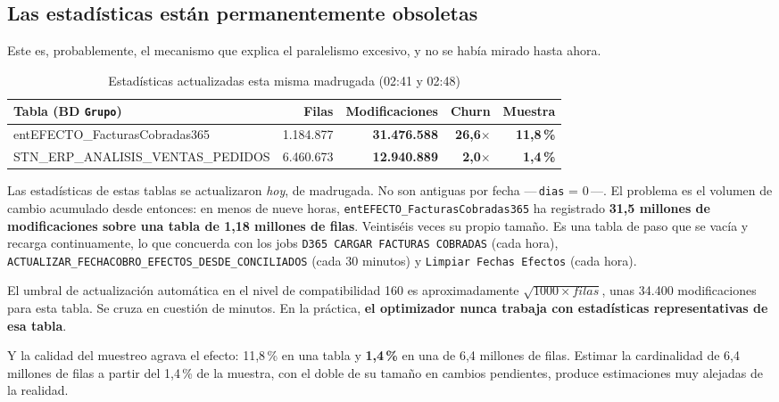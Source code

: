 \documentclass[11pt,a4paper]{article}
\newcommand{\cod}[1]{\texttt{\small #1}}
\newcommand{\critico}[1]{\textcolor{rojo}{\textbf{#1}}}
\begin{document}
\subsection{Las estadísticas están permanentemente obsoletas}

Este es, probablemente, el mecanismo que explica el paralelismo excesivo, y no
se había mirado hasta ahora.

\begin{table}[h]
\centering
\small
\begin{tabular}{lrrrr}
\toprule
\textbf{Tabla (BD \cod{Grupo})} & \textbf{Filas} & \textbf{Modificaciones} &
\textbf{Churn} & \textbf{Muestra} \\
\midrule
entEFECTO\_FacturasCobradas365 & 1.184.877 & \critico{31.476.588} &
  \critico{26,6$\times$} & \critico{11,8\,\%} \\
STN\_ERP\_ANALISIS\_VENTAS\_PEDIDOS & 6.460.673 & \critico{12.940.889} &
  \critico{2,0$\times$} & \critico{1,4\,\%} \\
\bottomrule
\end{tabular}
\caption{Estadísticas actualizadas esta misma madrugada (02:41 y 02:48)}
\end{table}

Las estadísticas de estas tablas se actualizaron \emph{hoy}, de madrugada. No
son antiguas por fecha —\,\cod{dias} = 0\,—. El problema es el volumen de
cambio acumulado desde entonces: en menos de nueve horas,
\cod{entEFECTO\_FacturasCobradas365} ha registrado \textbf{31,5 millones de
modificaciones sobre una tabla de 1,18 millones de filas}. Veintiséis veces su
propio tamaño. Es una tabla de paso que se vacía y recarga continuamente, lo
que concuerda con los jobs \cod{D365 CARGAR FACTURAS COBRADAS} (cada hora),
\cod{ACTUALIZAR\_FECHACOBRO\_EFECTOS\_DESDE\_CONCILIADOS} (cada 30 minutos) y
\cod{Limpiar Fechas Efectos} (cada hora).

El umbral de actualización automática en el nivel de compatibilidad 160 es
aproximadamente $\sqrt{1000 \times filas}$, unas 34.400 modificaciones para
esta tabla. Se cruza en cuestión de minutos. En la práctica, \textbf{el
optimizador nunca trabaja con estadísticas representativas de esa tabla}.

Y la calidad del muestreo agrava el efecto: 11,8\,\% en una tabla y
\textbf{1,4\,\%} en una de 6,4 millones de filas. Estimar la cardinalidad de
6,4 millones de filas a partir del 1,4\,\% de la muestra, con el doble de su
tamaño en cambios pendientes, produce estimaciones muy alejadas de la
realidad.
\end{document}
